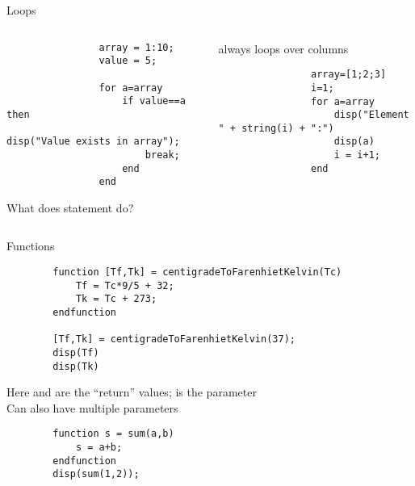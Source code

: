 \begin{frame}[fragile]{Loops}
    \begin{columns}
        \begin{column}{0.5\linewidth}
            \begin{lstlisting}
                array = 1:10;
                value = 5;
                
                for a=array
                    if value==a then
                        disp("Value exists in array");
                        break;
                    end
                end
            \end{lstlisting}
            What does  statement do?
        \end{column}
        \begin{column}{0.49\linewidth}
            \scilab{} always loops over columns
            \begin{lstlisting}
                array=[1;2;3]
                i=1;
                for a=array
                    disp("Element " + string(i) + ":")
                    disp(a)
                    i = i+1;
                end
            \end{lstlisting}
        \end{column}
    \end{columns}
\end{frame}

\begin{frame}[fragile]{Functions}
    \begin{lstlisting}
        function [Tf,Tk] = centigradeToFarenhietKelvin(Tc)
            Tf = Tc*9/5 + 32;
            Tk = Tc + 273;
        endfunction
        
        [Tf,Tk] = centigradeToFarenhietKelvin(37);
        disp(Tf)
        disp(Tk)
    \end{lstlisting}
    Here  and  are the ``return'' values;  is the parameter\\[0.5em]
    Can also have multiple parameters
    \begin{lstlisting}
        function s = sum(a,b)
            s = a+b;
        endfunction
        disp(sum(1,2));
    \end{lstlisting}
\end{frame}

